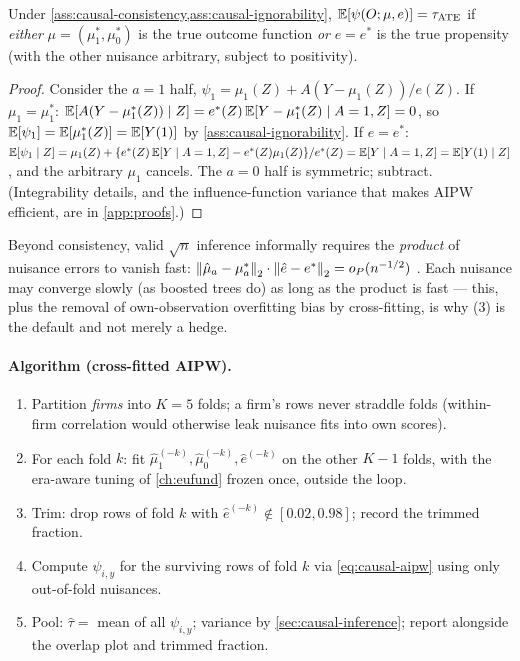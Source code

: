 \begin{proposition}\label{prop:causal-dr}
Under \cref{ass:causal-consistency,ass:causal-ignorability}, $\mathbb{E}[\psi(O; \mu, e)] =
\tau_{\mathrm{ATE}}$ if \emph{either} $\mu = (\mu_1^*, \mu_0^*)$ is the true outcome function
\emph{or} $e = e^*$ is the true propensity (with the other nuisance arbitrary, subject to
positivity).
\end{proposition}

\begin{proof}
Consider the $a=1$ half, $\psi_1 = \mu_1(Z) + A(Y - \mu_1(Z))/e(Z)$. If $\mu_1 = \mu_1^*$:
$\mathbb{E}[A(Y - \mu_1^*(Z)) \mid Z] = e^*(Z)\,\mathbb{E}[Y - \mu_1^*(Z) \mid A=1, Z] = 0$, so $\mathbb{E}[\psi_1] =
\mathbb{E}[\mu_1^*(Z)] = \mathbb{E}[Y(1)]$ by \cref{ass:causal-ignorability}. If $e = e^*$: $\mathbb{E}[\psi_1 \mid Z] =
\mu_1(Z) + \{e^*(Z)\,\mathbb{E}[Y \mid A=1,Z] - e^*(Z)\mu_1(Z)\}/e^*(Z) = \mathbb{E}[Y \mid A=1, Z] = \mathbb{E}[Y(1) \mid
Z]$, and the arbitrary $\mu_1$ cancels. The $a=0$ half is symmetric; subtract. (Integrability
details, and the influence-function variance that makes AIPW efficient, are in
\cref{app:proofs}.)
\end{proof}

\begin{remark}\label{rem:causal-rates}
Beyond consistency, valid $\sqrt{n}$ inference informally requires the \emph{product} of
nuisance errors to vanish fast: $\left\lVert\hat\mu_a - \mu_a^*\right\rVert_{2} \cdot \left\lVert\hat e - e^*\right\rVert_{2} =
o_P(n^{-1/2})$ \citep{chernozhukov2018}. Each nuisance may converge slowly (as boosted trees do)
as long as the product is fast --- this, plus the removal of own-observation overfitting bias by
cross-fitting, is why (3) is the default and not merely a hedge.
\end{remark}

\paragraph{Algorithm (cross-fitted AIPW).}
\begin{enumerate}
\item Partition \emph{firms} into $K = 5$ folds; a firm's rows never straddle folds (within-firm
correlation would otherwise leak nuisance fits into own scores).
\item For each fold $k$: fit $\hat\mu_1^{(-k)}, \hat\mu_0^{(-k)}, \hat e^{(-k)}$ on the other
$K-1$ folds, with the era-aware tuning of \cref{ch:eufund} frozen once, outside the loop.
\item Trim: drop rows of fold $k$ with $\hat e^{(-k)} \notin [0.02, 0.98]$; record the trimmed
fraction.
\item Compute $\psi_{i,y}$ for the surviving rows of fold $k$ via \cref{eq:causal-aipw} using
only out-of-fold nuisances.
\item Pool: $\hat\tau = $ mean of all $\psi_{i,y}$; variance by \cref{sec:causal-inference};
report alongside the overlap plot and trimmed fraction.
\end{enumerate}

